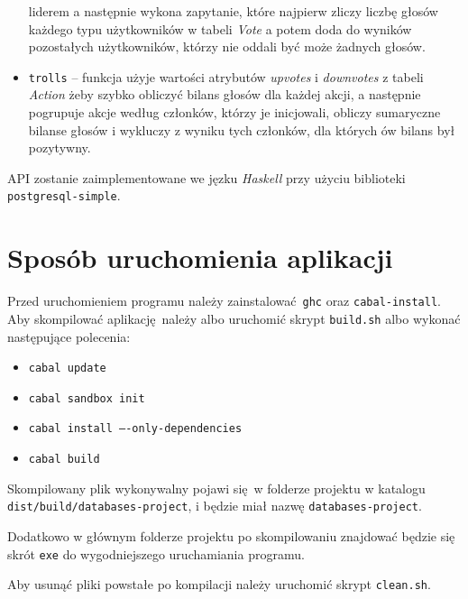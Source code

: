 \documentclass[12pt]{article}
\begin{document}
\begin{itemize}
{          liderem a następnie wykona zapytanie, które najpierw zliczy liczbę
          głosów każdego typu użytkowników w tabeli \textit{Vote} a potem
          doda do wyników pozostałych użytkowników, którzy nie oddali być może 
          żadnych głosów.}
    \item{\texttt{trolls} -- funkcja użyje wartości atrybutów \textit{upvotes} i 
          \textit{downvotes} z tabeli \textit{Action} żeby szybko obliczyć bilans
          głosów dla każdej akcji, a następnie pogrupuje akcje według członków,
          którzy je inicjowali, obliczy sumaryczne bilanse głosów i wykluczy
          z wyniku tych członków, dla których ów bilans był pozytywny.}
\end{itemize}

API zostanie zaimplementowane we jęzku \textit{Haskell} przy użyciu biblioteki
\texttt{postgresql-simple}.


\section{Sposób uruchomienia aplikacji}

Przed uruchomieniem programu należy zainstalować \texttt{ghc} oraz 
\texttt{cabal-install}.
Aby skompilować aplikację należy albo uruchomić skrypt \texttt{build.sh} albo
wykonać następujące polecenia:
\begin{itemize}
    \item{\texttt{cabal update}}
    \item{\texttt{cabal sandbox init}}
    \item{\texttt{cabal install ----only-dependencies}}
    \item{\texttt{cabal build}}
\end{itemize}

Skompilowany plik wykonywalny pojawi się w folderze projektu w katalogu 
\texttt{dist/build/databases-project}, i będzie miał nazwę \texttt{databases-project}.

Dodatkowo w głównym folderze projektu po skompilowaniu znajdować będzie się skrót
\texttt{exe} do wygodniejszego uruchamiania programu.

Aby usunąć pliki powstałe po kompilacji należy uruchomić skrypt \texttt{clean.sh}.
\end{document}
